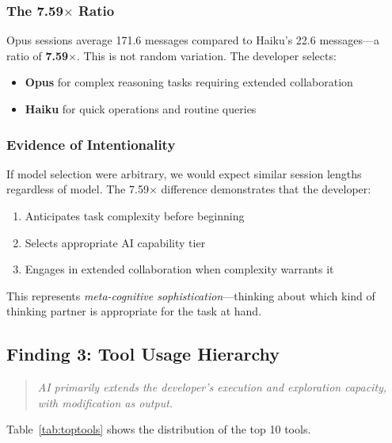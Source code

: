 \documentclass{ntlabs-preprint}
\begin{document}
\subsubsection{The 7.59$\times$ Ratio}

Opus sessions average 171.6 messages compared to Haiku's 22.6 messages---a ratio of \textbf{7.59$\times$}. This is not random variation. The developer selects:
\begin{itemize}
    \item \textbf{Opus} for complex reasoning tasks requiring extended collaboration
    \item \textbf{Haiku} for quick operations and routine queries
\end{itemize}

\subsubsection{Evidence of Intentionality}

If model selection were arbitrary, we would expect similar session lengths regardless of model. The 7.59$\times$ difference demonstrates that the developer:
\begin{enumerate}
    \item Anticipates task complexity before beginning
    \item Selects appropriate AI capability tier
    \item Engages in extended collaboration when complexity warrants it
\end{enumerate}

This represents \textit{meta-cognitive sophistication}---thinking about which kind of thinking partner is appropriate for the task at hand.

\subsection{Finding 3: Tool Usage Hierarchy}

\begin{quote}
\textit{AI primarily extends the developer's execution and exploration capacity, with modification as output.}
\end{quote}

Table~\ref{tab:toptools} shows the distribution of the top 10 tools.
\end{document}
